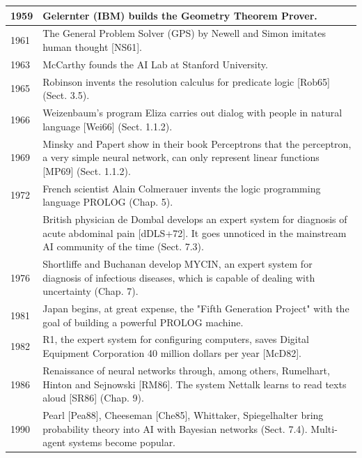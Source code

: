 \documentclass[10pt]{article}
\begin{document}
\begin{table}[h]
\begin{center}
\begin{tabular}{|l|l|}
\hline
1959 & Gelernter (IBM) builds the Geometry Theorem Prover. \\
\hline
1961 & The General Problem Solver (GPS) by Newell and Simon imitates human thought [NS61]. \\
\hline
1963 & McCarthy founds the AI Lab at Stanford University. \\
\hline
1965 & Robinson invents the resolution calculus for predicate logic [Rob65] (Sect. 3.5). \\
\hline
1966 & Weizenbaum's program Eliza carries out dialog with people in natural language [Wei66] (Sect. 1.1.2). \\
\hline
1969 & Minsky and Papert show in their book Perceptrons that the perceptron, a very simple neural network, can only represent linear functions [MP69] (Sect. 1.1.2). \\
\hline
1972 & French scientist Alain Colmerauer invents the logic programming language PROLOG (Chap. 5). \\
\hline
 & British physician de Dombal develops an expert system for diagnosis of acute abdominal pain [dDLS+72]. It goes unnoticed in the mainstream AI community of the time (Sect. 7.3). \\
\hline
1976 & Shortliffe and Buchanan develop MYCIN, an expert system for diagnosis of infectious diseases, which is capable of dealing with uncertainty (Chap. 7). \\
\hline
1981 & Japan begins, at great expense, the "Fifth Generation Project" with the goal of building a powerful PROLOG machine. \\
\hline
1982 & R1, the expert system for configuring computers, saves Digital Equipment Corporation 40 million dollars per year [McD82]. \\
\hline
1986 & Renaissance of neural networks through, among others, Rumelhart, Hinton and Sejnowski [RM86]. The system Nettalk learns to read texts aloud [SR86] (Chap. 9). \\
\hline
1990 & Pearl [Pea88], Cheeseman [Che85], Whittaker, Spiegelhalter bring probability theory into AI with Bayesian networks (Sect. 7.4). Multi-agent systems become popular. \\
\hline
\end{tabular}
\end{center}
\end{table}
\end{document}
